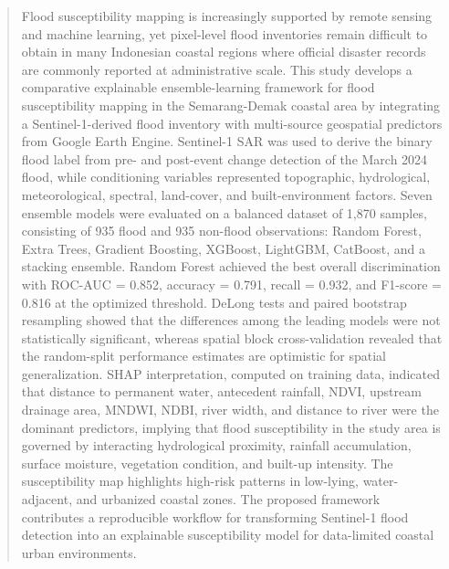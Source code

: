 \documentclass[11pt,twoside]{article}
\author{
\begin{minipage}{\textwidth}
\authorone,
\authortwo,
\authorthree,
\authorfour,
\authorfive,
\authorsix
\\[1em]
$^1$ \affilone\\
\corrauthor
\end{minipage}
}
\begin{document}
\maketitle

\begin{abstract}
 
Flood susceptibility mapping is increasingly supported by remote sensing and
machine learning, yet pixel-level flood inventories remain difficult to obtain
in many Indonesian coastal regions where official disaster records are commonly
reported at administrative scale. This study develops a comparative explainable
ensemble-learning framework for flood susceptibility mapping in the
Semarang-Demak coastal area by integrating a Sentinel-1-derived flood inventory
with multi-source geospatial predictors from Google Earth Engine. Sentinel-1 SAR was used to derive the binary flood label from pre- and
post-event change detection of the March 2024 flood, while conditioning
variables represented topographic, hydrological, meteorological, spectral,
land-cover, and built-environment factors. Seven ensemble models were evaluated
on a balanced dataset of 1,870 samples, consisting of 935 flood and 935
non-flood observations: Random Forest, Extra Trees, Gradient Boosting, XGBoost,
LightGBM, CatBoost, and a stacking ensemble. Random Forest achieved the best
overall discrimination with ROC-AUC = 0.852, accuracy = 0.791, recall = 0.932,
and F1-score = 0.816 at the optimized threshold. DeLong tests and paired
bootstrap resampling showed that the differences among the leading models were
not statistically significant, whereas spatial block cross-validation revealed
that the random-split performance estimates are optimistic for spatial
generalization. SHAP interpretation, computed on training data, indicated that
distance to permanent water, antecedent rainfall, NDVI, upstream drainage
area, MNDWI, NDBI, river width, and distance to river were the dominant
predictors, implying that flood susceptibility in the study area is governed
by interacting hydrological proximity, rainfall accumulation, surface
moisture, vegetation condition, and built-up intensity. The susceptibility map
highlights high-risk patterns in low-lying, water-adjacent, and urbanized
coastal zones. The proposed framework contributes a reproducible workflow for
transforming Sentinel-1 flood detection into an explainable susceptibility model
for data-limited coastal urban environments.
 
\end{abstract}
 
\end{document}
